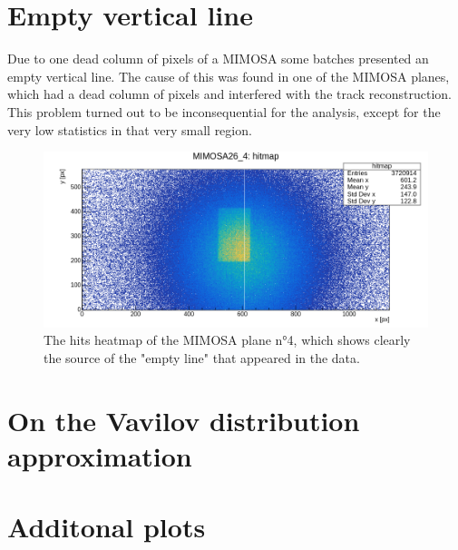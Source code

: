 \section{Empty vertical line}
Due to one dead column of pixels of a MIMOSA  some batches presented an empty vertical line. The cause of this was found in one of the MIMOSA planes, which had a dead column of pixels and interfered with the track reconstruction. This problem turned out to be inconsequential for the analysis, except for the very low statistics in that very small region.
\begin{figure}[!ht]
    \centering
    \includegraphics[width=.9\linewidth]{Images/appendix/hits_MIMOSA4.png}
    \caption{The hits heatmap of the MIMOSA plane n°4, which shows clearly the source of the "empty line" that appeared in the data.}
    \label{fig:MIMOSA4_hits}
\end{figure}


\section[Vavilov vs Landau distribution]{On the Vavilov distribution approximation}\label{sec:vavilov_vs_landau_distribution}

% 


\section{Additonal plots}\label{sec:additional_plots}

